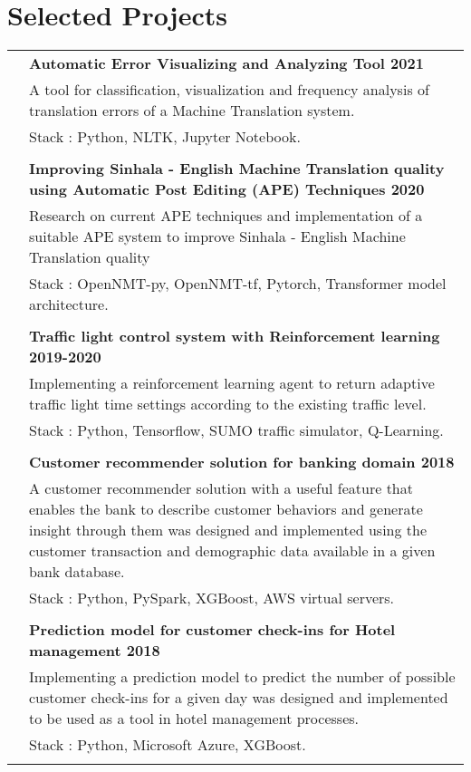 \documentclass[a4paper,11pt]{article}
\begin{document}
\section{Selected Projects}
\begin{tabular}{r|p{17.5cm}}
 \emph{} & \normalsize \bf Automatic Error Visualizing and Analyzing Tool 2021 \textsc{}  \\\textsc{}&\small{A tool for classification, visualization and frequency analysis of translation errors of a Machine Translation system.}\\&\footnotesize{Stack : Python, NLTK, Jupyter Notebook.}\\\multicolumn{2}{c}{} \\
 \emph{} & \normalsize \bf Improving Sinhala - English Machine Translation quality using Automatic Post Editing (APE) Techniques 2020\textsc{}  \\\textsc{}&\small{Research  on current APE techniques and implementation of a suitable APE system to improve Sinhala - English Machine Translation quality}\\&\footnotesize{Stack : OpenNMT-py, OpenNMT-tf, Pytorch, Transformer model architecture.}\\\multicolumn{2}{c}{} \\
 
 \emph{} & \normalsize \bf Traffic light control system with Reinforcement learning   2019-2020 \textsc{}  \\\textsc{}&\small{Implementing a reinforcement learning agent to return adaptive traffic light time settings according to the existing traffic level.}\\&\footnotesize{Stack : Python, Tensorflow, SUMO traffic simulator, Q-Learning.}\\\multicolumn{2}{c}{} \\

 \textsc{} & \normalsize \bf Customer recommender solution for banking domain 2018 \\&\small {A customer recommender solution with a useful feature that enables the bank to describe customer behaviors and generate insight through them was designed and implemented using the customer transaction and demographic data available in a given bank database. }\\&\footnotesize{Stack : Python, PySpark, XGBoost, AWS virtual servers.}\\\multicolumn{2}{c}{} \\
 
\textsc{} & \normalsize \bf Prediction model for customer check-ins for Hotel management 2018 \\&\small {Implementing a prediction model to predict the number of possible customer check-ins for a given day was designed and implemented to be used as a tool in hotel management processes.}\\&\footnotesize{Stack : Python, Microsoft Azure, XGBoost.}\\\multicolumn{2}{c}{} \\
  
\end{tabular}
\end{document}
